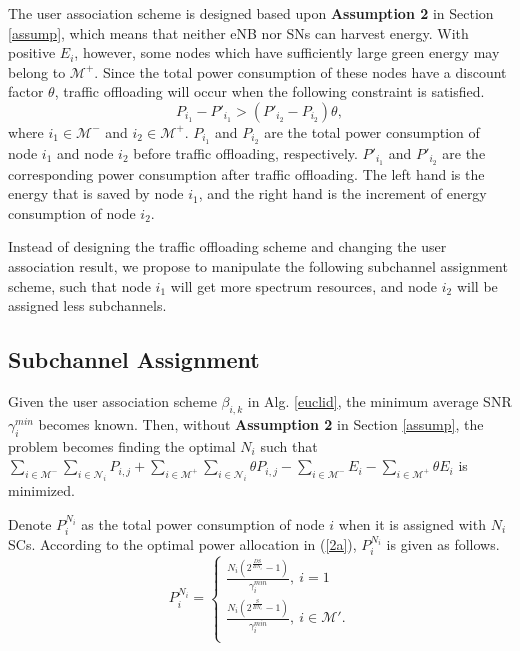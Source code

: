 \documentclass[journal,12pt,onecolumn]{IEEEtran}
\begin{document}
The user association scheme is designed based upon {\bf{Assumption 2}} in Section \ref{assump}, which means that neither eNB nor SNs can harvest energy. With positive $E_i$, however, some nodes which have sufficiently large green energy may belong to $\mathcal{M}^+$. Since the total power consumption of these nodes have a discount factor $\theta$, traffic offloading will occur when the following constraint is satisfied.
\begin{equation}\label{offload}
P_{i_1}-P'_{i_1}>(P'_{i_2}-P_{i_2})\theta,
\end{equation}
where $i_1\in\mathcal{M}^-$ and $i_2\in\mathcal{M}^+$. $P_{i_1}$ and $P_{i_2}$ are the total power consumption of node $i_1$ and node $i_2$ before traffic offloading, respectively. $P'_{i_1}$ and $P'_{i_2}$ are the corresponding power consumption after traffic offloading.
The left hand is the energy that is saved by node $i_1$, and the right hand is the increment of energy consumption of node $i_2$. 

Instead of designing the traffic offloading scheme and changing the user association result, we propose to manipulate the following subchannel assignment scheme, such that node $i_1$ will get more spectrum resources, and node $i_2$ will be assigned less subchannels.


\subsection{Subchannel Assignment}
Given the user association scheme $\beta_{i,k}$ in Alg. \ref{euclid}, the minimum average SNR $\gamma_{i}^{min}$ becomes known. Then, without {\bf{Assumption 2}} in Section \ref{assump}, the problem becomes finding the optimal $N_i$ such that $\sum\nolimits_{i\in\mathcal{M}^-}{\sum\nolimits_{i\in\mathcal{N}_i}P_{i,j}} + \sum\nolimits_{i\in\mathcal{M}^+}{\sum\nolimits_{i\in\mathcal{N}_i}\theta P_{i,j}}-\sum\nolimits_{i\in\mathcal{M}^-} E_i-\sum\nolimits_{i\in\mathcal{M}^+} \theta E_i$ is minimized.



Denote $P_i^{N_i}$ as the total power consumption of node $i$ when it is assigned with $N_i$ SCs. According to the optimal power allocation in (\ref{2a}), $P_i^{N_i}$ is given as follows. 
\begin{equation}
P_i^{N_i}=\left\{
\begin{array}{*{20}{c}}
\frac{N_i({2^{\frac{DS}{BN_i}}-1})}{\gamma_i^{min}},\:i=1\\
\frac{N_i({2^{\frac{S}{BN_i}}-1})}{\gamma_i^{min}},\:i\in\mathcal{M}'.\\
\end{array}\right.
\end{equation}
\end{document}
